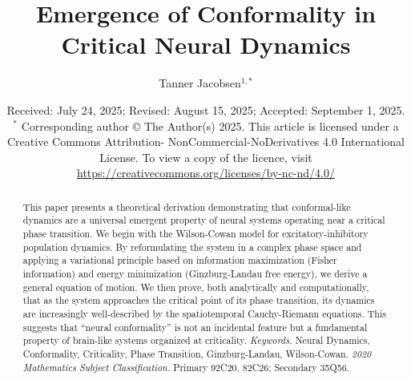 \documentclass[12pt, reqno]{amsart}
\theoremstyle{definition}
\theoremstyle{remark}
\numberwithin{equation}{section}
\begin{document}
\setcounter{page}{1}


\centerline{}
\centerline{}


\title[Emergence of Conformality]{Emergence of Conformality in Critical Neural Dynamics}

\author[T. Jacobsen]{Tanner Jacobsen$^{1,*}$}

\address{$^{1}$ TNSR-Q, Nashville, TN, USA.}
\email{\textcolor[rgb]{0.00,0.00,0.84}{quantquiplabs@gmail.com}}

\date{Received: July 24, 2025; Revised: August 15, 2025; Accepted: September 1, 2025.
\newline \indent $^{*}$ Corresponding author
\newline \indent © The Author(s) 2025. This article is licensed under a Creative Commons Attribution-
\newline \indent NonCommercial-NoDerivatives 4.0
International License. To view a copy of the licence, visit 
\newline \indent \url{https://creativecommons.org/licenses/by-nc-nd/4.0/}}

\begin{abstract}
This paper presents a theoretical derivation demonstrating that conformal-like dynamics are a universal emergent property of neural systems operating near a critical phase transition. We begin with the Wilson-Cowan model for excitatory-inhibitory population dynamics. By reformulating the system in a complex phase space and applying a variational principle based on information maximization (Fisher information) and energy minimization (Ginzburg-Landau free energy), we derive a general equation of motion. We then prove, both analytically and computationally, that as the system approaches the critical point of its phase transition, its dynamics are increasingly well-described by the spatiotemporal Cauchy-Riemann equations. This suggests that ``neural conformality'' is not an incidental feature but a fundamental property of brain-like systems organized at criticality.
\newline
\newline
\noindent \textit{Keywords.} Neural Dynamics, Conformality, Criticality, Phase Transition, Ginzburg-Landau, Wilson-Cowan.
\newline
\noindent \textit{2020 Mathematics Subject Classification.} Primary 92C20, 82C26; Secondary 35Q56.
\end{abstract} \maketitle
\end{document}
